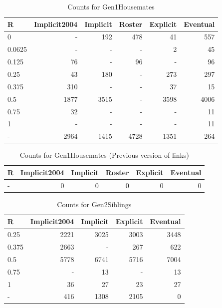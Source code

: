 \documentclass[a4paper]{article}\usepackage[]{graphicx}\usepackage[]{color}
\begin{document}
\begin{table}[ht]
\centering
\begingroup\large
\begin{tabular}{lrrrrr}
  \hline
R & Implicit2004 & Implicit & Roster & Explicit & Eventual \\ 
  \hline
0 & - & 192 & 478 &  41 & 557 \\ 
  0.0625 & - & - & - &   2 &  45 \\ 
  0.125 &  76 & - &  96 & - &  96 \\ 
  0.25 &  43 & 180 & - & 273 & 297 \\ 
  0.375 & 310 & - & - &  37 &  15 \\ 
  0.5 & 1877 & 3515 & - & 3598 & 4006 \\ 
  0.75 &  32 & - & - & - &  11 \\ 
  1 & - & - & - & - &  11 \\ 
  - & 2964 & 1415 & 4728 & 1351 & 264 \\ 
   \hline
\end{tabular}
\endgroup
\caption{Counts for Gen1Housemates} 
\end{table}
\begin{table}[ht]
\centering
\begingroup\large
\begin{tabular}{lrrrrr}
  \hline
R & Implicit2004 & Implicit & Roster & Explicit & Eventual \\ 
  \hline
- &   0 &   0 &   0 &   0 &   0 \\ 
   \hline
\end{tabular}
\endgroup
\caption{Counts for Gen1Housemates (Previous version of links)} 
\end{table}
\begin{table}[ht]
\centering
\begingroup\large
\begin{tabular}{lrrrr}
  \hline
R & Implicit2004 & Implicit & Explicit & Eventual \\ 
  \hline
0.25 & 2221 & 3025 & 3003 & 3448 \\ 
  0.375 & 2663 & - & 267 & 622 \\ 
  0.5 & 5778 & 6741 & 5716 & 7004 \\ 
  0.75 & - &  13 & - &  13 \\ 
  1 &  36 &  27 &  23 &  27 \\ 
  - & 416 & 1308 & 2105 &   0 \\ 
   \hline
\end{tabular}
\endgroup
\caption{Counts for Gen2Siblings} 
\end{table}
\end{document}
